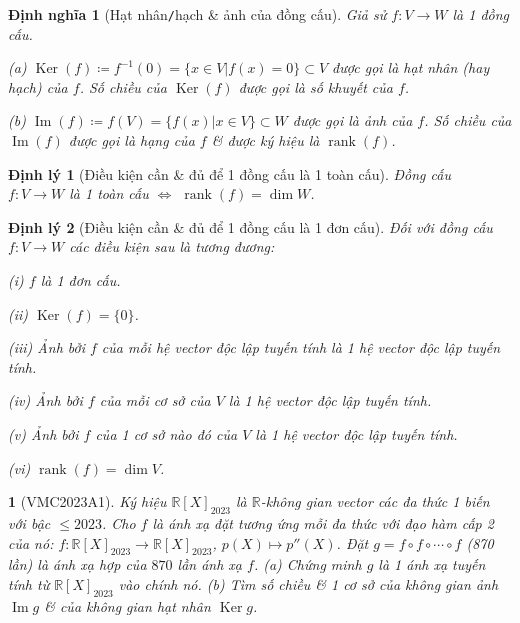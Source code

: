 \documentclass{article}
\newtheorem{baitoan}{}
\newtheorem{dinhly}{Định lý}
\newtheorem{dinhnghia}{Định nghĩa}
\begin{document}
\begin{dinhnghia}[Hạt nhân{\tt/}hạch \& ảnh của đồng cấu]
	Giả sử $f:V\to W$ là 1 đồng cấu.
	\item(a) $\operatorname{Ker}(f)\coloneqq f^{-1}(0) = \{x\in V|f(x) = 0\}\subset V$ được gọi là \emph{hạt nhân} (hay \emph{hạch}) của $f$. Số chiều của $\operatorname{Ker}(f)$ được gọi là \emph{số khuyết} của $f$.
	\item(b) $\operatorname{Im}(f)\coloneqq f(V) = \{f(x)|x\in V\}\subset W$ được gọi là \emph{ảnh} của $f$. Số chiều của $\operatorname{Im}(f)$ được gọi là \emph{hạng} của $f$ \& được ký hiệu là $\operatorname{rank}(f)$.
\end{dinhnghia}

\begin{dinhly}[Điều kiện cần \& đủ để 1 đồng cấu là 1 toàn cấu]
	Đồng cấu $f:V\to W$ là 1 toàn cấu $\Leftrightarrow$ $\operatorname{rank}(f) = \dim W$.
\end{dinhly}

\begin{dinhly}[Điều kiện cần \& đủ để 1 đồng cấu là 1 đơn cấu]
	Đối với đồng cấu $f:V\to W$ các điều kiện sau là tương đương:
	\item(i) $f$ là 1 đơn cấu.
	\item(ii) $\operatorname{Ker}(f) = \{0\}$.
	\item(iii) Ảnh bởi $f$ của mỗi hệ vector độc lập tuyến tính là 1 hệ vector độc lập tuyến tính.
	\item(iv) Ảnh bởi $f$ của mỗi cơ sở của $V$ là 1 hệ vector độc lập tuyến tính.
	\item(v) Ảnh bởi $f$ của 1 cơ sở nào đó của $V$ là 1 hệ vector độc lập tuyến tính.
	\item(vi) $\operatorname{rank}(f) = \dim V$.
\end{dinhly}

\begin{baitoan}[VMC2023A1]
	Ký hiệu $\mathbb{R}[X]_{2023}$ là $\mathbb{R}$-không gian vector các đa thức 1 biến với bậc $\le2023$. Cho $f$ là ánh xạ đặt tương ứng mỗi đa thức với đạo hàm cấp 2 của nó: $f:\mathbb{R}[X]_{2023}\to\mathbb{R}[X]_{2023}$, $p(X)\mapsto p''(X)$. Đặt $g = f\circ f\circ\cdots\circ f$ (870 lần) là ánh xạ hợp của $870$ lần ánh xạ $f$. (a) Chứng minh $g$ là 1 ánh xạ tuyến tính từ $\mathbb{R}[X]_{2023}$ vào chính nó. (b) Tìm số chiều \& 1 cơ sở của không gian ảnh $\operatorname{Im}g$ \& của không gian hạt nhân $\operatorname{Ker}g$.
\end{baitoan}
\end{document}
